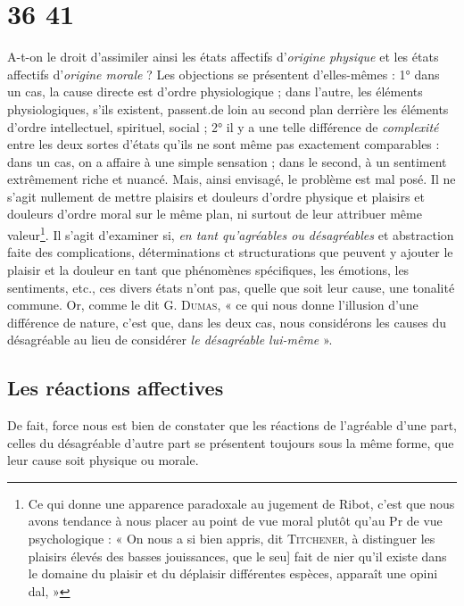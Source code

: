 
\section{36 41}
%
A-t-on le droit d’assimiler ainsi les états affectifs d’{\it origine physique} et
les états affectifs d’{\it origine morale} ? Les objections se présentent d'elles-mêmes :
1° dans un cas, la cause directe est d'ordre physiologique ;
dans l’autre, les éléments physiologiques, s’ils existent, passent.de
loin au second plan derrière les éléments d'ordre intellectuel, spirituel,
social ; 
2° il y a une telle différence de {\it complexité} entre les deux sortes
d'états qu’ils ne sont même pas exactement comparables : dans un
cas, on a affaire à une simple sensation ; dans le second, à un sentiment
extrêmement riche et nuancé. Mais, ainsi envisagé, le problème
est mal posé. Il ne s’agit nullement de mettre plaisirs et douleurs
d’ordre physique et plaisirs et douleurs d’ordre moral sur le même
plan, ni surtout de leur attribuer même valeur\footnote{
Ce qui donne une apparence paradoxale au jugement de Ribot, c'est que nous
avons tendance à nous placer au point de vue moral plutôt qu'au Pr de vue psychologique :
« On nous a si bien appris, dit \textsc{Titchener}, à distinguer les plaisirs élevés des
basses jouissances, que le seu] fait de nier qu'il existe dans le domaine du plaisir et du
déplaisir différentes espèces, apparaît une opini dal, »
}. Il s’agit d'examiner
si, {\it en tant qu'agréables ou désagréables} et abstraction faite des complications,
déterminations ct structurations que peuvent y ajouter le
plaisir et la douleur en tant que phénomènes spécifiques, les émotions,
les sentiments, etc., ces divers états n’ont pas, quelle que soit leur
cause, une tonalité commune. Or, comme le dit G. \textsc{Dumas}, « ce qui
nous donne l'illusion d’une différence de nature, c’est que, dans les
deux cas, nous considérons les causes du désagréable au lieu de
considérer {\it le désagréable lui-même} ».

\subsection{Les réactions affectives}%
De fait, force nous est bien de
constater que les réactions de l’agréable d’une part, celles du désagréable
d’autre part se présentent toujours sous la même forme, que
leur cause soit physique ou morale.


